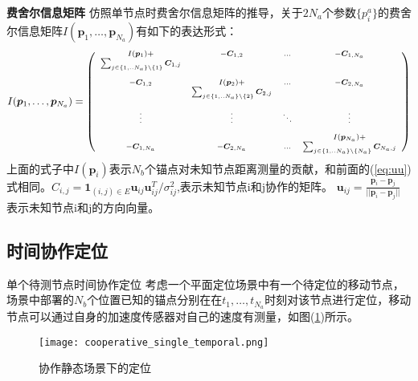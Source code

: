 \textbf{费舍尔信息矩阵}
仿照单节点时费舍尔信息矩阵的推导，关于$2N_a$个参数$\{p_i^a\}$的费舍尔信息矩阵$I(\bm{p}_1,\dots,\bm{p}_{N_a})$有如下的表达形式：
\begin{equation}
\scriptsize{
I(\bm{p}_1,\dots,\bm{p}_{N_a})=
\left(
\begin{array}{cccc}
I(\bm{p}_1)+&-\bm{C}_{1,2}&...&-\bm{C}_{1,N_a}\\
\sum_{j\in \{1,..N_a\}\backslash\{1\}}\bm{C}_{1,j}&&&\\
&&&\\
-\bm{C}_{1,2} & I(\bm{p}_2)+
&...&-\bm{C}_{2,N_a}\\
&\sum_{j\in \{1,..N_a\}\backslash \{2\}}\bm{C}_{2,j}&&\\
&&&\\
\vdots &\vdots&\ddots &\vdots\\
&&&\\
&&&I(\bm{p}_{N_a})+\\
-\bm{C}_{1,N_a}&-\bm{C}_{2,N_a}&...& \sum_{j\in \{1,..N_a\}\backslash\{N_a\}}\bm{C}_{N_a,j}\\
\end{array}
\right)
}
\end{equation}
上面的式子中$I(\bm{p}_i)$表示$N_b$个锚点对未知节点距离测量的贡献，和前面的(\ref{eq:uu})式相同。$C_{i,j}=\bm{1}_{(i,j)\in E}\bm{u}_{ij}\bm{u}_{ij}^T/\sigma^2_{ij}$,表示未知节点i和j协作的矩阵。
$\bm{u}_{ij}=\frac{\bm{p}_i-\bm{p}_j}{||\bm{p}_i-\bm{p}_j||}$表示未知节点i和j的方向向量。
\subsection[时间协作定位]{时间协作定位}

{单个待测节点时间协作定位}
考虑一个平面定位场景中有一个待定位的移动节点，场景中部署的$N_b$个位置已知的锚点分别在在$t_1,\dots,t_{N_a}$时刻对该节点进行定位，移动节点可以通过自身的加速度传感器对自己的速度有测量，如图(\ref{fig:cooperative_single_temporal})所示。
        \begin{figure}
          \centering
          \texttt{[image: cooperative\_single\_temporal.png]}
          \caption{协作静态场景下的定位}\label{fig:cooperative_single_temporal}
        \end{figure}

